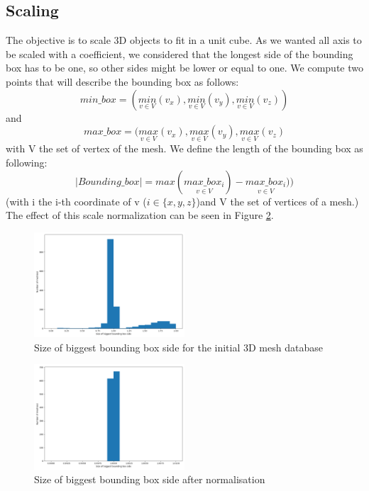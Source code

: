 \documentclass[10pt,twocolumn,letterpaper]{article}
\begin{document}
\subsection{Scaling}
	The objective is to scale 3D objects to fit in a unit cube. As we wanted all axis to be scaled with a coefficient, we considered that the longest side of the bounding box has to be one, so other sides might be lower or equal to one.
We compute two points that will describe the bounding box as follows:
$$min\_box = (\underset{v \in V}{min}(v_x),\underset{v \in V}{min}(v_y),\underset{v \in V}{min}(v_z)) $$ and $$max\_box = (\underset{v \in V}{max}(v_x), \underset{v \in V}{max}(v_y), \underset{v \in V}{max}(v_z)$$ with V the set of vertex of the mesh.
We define the length of the bounding box as following:
$$ |Bounding\_box| = max(\underset{v \in V}{max\_box_i}) - \underset{v \in V}{max\_box_i}))$$ (with i the i-th coordinate of v ($i \in \{x,y,z\}$)and V the set of vertices of a mesh.)
The effect of this scale normalization can be seen in Figure \ref{fig:box-size-after}.

\begin{figure}[h!]
\begin{center}
  \includegraphics[width=0.5\textwidth]{picture/Initial size of biggest bounding box side}
  \caption{Size of biggest bounding box side for the initial 3D mesh database}
  \label{fig:box-size-before}
  \end{center}
\end{figure}

\begin{figure}[h!]
\begin{center}
  \includegraphics[width=0.5\textwidth]{picture/Normalised size of biggest bounding box side}
  \caption{Size of biggest bounding box side after normalisation}
  \label{fig:box-size-after}
  \end{center}
\end{figure}
\end{document}
